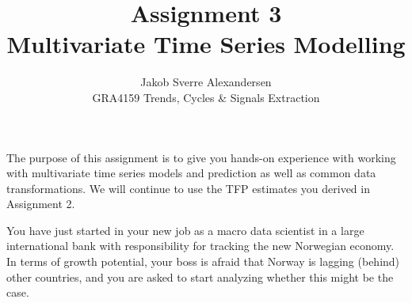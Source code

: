 \documentclass[10pt]{article}
\begin{document}
 
\title{Assignment 3 \\Multivariate Time Series Modelling}
\author{Jakob Sverre Alexandersen\\
GRA4159 Trends, Cycles \& Signals Extraction}
\maketitle

The purpose of this assignment is to give you hands-on experience with working with multivariate time series models and prediction as well as common data transformations. We will continue to use the TFP estimates you derived in Assignment 2. 

You have just started in your new job as a macro data scientist in a large international bank with responsibility for tracking the new Norwegian economy. In terms of growth potential, your boss is afraid that Norway is lagging (behind) other countries, and you are asked to start analyzing whether this might be the case. 
\end{document}
